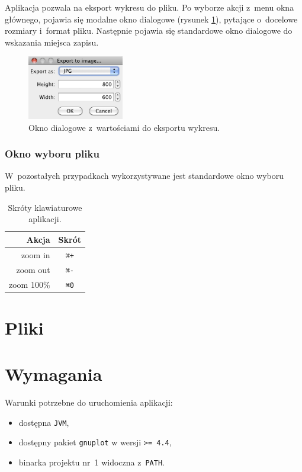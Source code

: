 \documentclass[10pt,a4paper]{article}
\newcommand{\prog}[1]{\texttt{#1}}
\begin{document}
Aplikacja pozwala na eksport wykresu do pliku. Po wyborze akcji z~menu okna
głównego, pojawia się modalne okno dialogowe (rysunek
\ref{fig:eksport-wykresu}), pytające o~docelowe rozmiary i~format pliku.
Następnie pojawia się standardowe okno dialogowe do wskazania miejsca zapisu.

\begin{figure}[h]
  \centering
  \includegraphics[width=0.374\textwidth]{images/eksport-wykresu}
  \caption{Okno dialogowe z~wartościami do eksportu wykresu.}
  \label{fig:eksport-wykresu}
\end{figure}

\subsubsection{Okno wyboru pliku}

W~pozostałych przypadkach wykorzystywane jest standardowe okno wyboru pliku.

\begin{table}[p]
  \centering
  \begin{tabular}{r c}
    \toprule
    {\bf Akcja} & {\bf Skrót} \\
    \midrule
    zoom in     &  \prog{⌘+}  \\
    zoom out    &  \prog{⌘-}  \\
    zoom 100\%  &  \prog{⌘0}  \\
    \bottomrule
  \end{tabular}
  \caption{Skróty klawiaturowe aplikacji.}
  \label{tab:skroty}
\end{table}

\section{Pliki}
\label{sec:pliki}

\section{Wymagania}
\label{sec:wymagania}

Warunki potrzebne do uruchomienia aplikacji:
\begin{itemize}
  \item dostępna \prog{JVM},
  \item dostępny pakiet \prog{gnuplot} w wersji \prog{>= 4.4},
  \item binarka projektu nr~1 widoczna z~\prog{PATH}.
\end{itemize}
\end{document}
